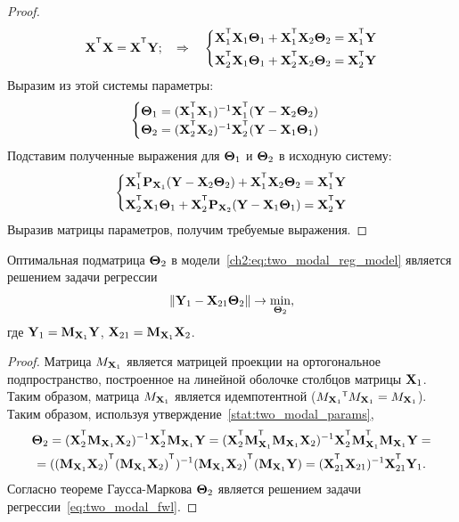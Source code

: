 \begin{proof}
	\[
		\bX^{\T} \bX = \bX^{\T} \bY; \quad \Rightarrow \quad
		\begin{cases*}
			\bX_1^{\T} \bX_1 \bTheta_1 + \bX_1^{\T} \bX_2 \bTheta_2 = \bX_1^{\T} \bY \\
			\bX_2^{\T} \bX_1 \bTheta_1 + \bX_2^{\T} \bX_2 \bTheta_2 = \bX_2^{\T} \bY 
		\end{cases*}
	\]
	Выразим из этой системы параметры:
	\[
		\begin{cases}
			\bTheta_1 = (\bX_1^{\T} \bX_1)^{-1} \bX_1^{\T} (\bY - \bX_2 \bTheta_2) \\
			\bTheta_2 = (\bX_2^{\T} \bX_2 )^{-1}  \bX_2^{\T} (\bY - \bX_1 \bTheta_1)
		\end{cases}
	\]
	Подставим полученные выражения для $\boldsymbol{\Theta}_1$ и $\boldsymbol{\Theta}_2$ в исходную систему:
	\[
				\begin{cases*}
					\bX_1^{\T} \bP_{\bX_1} (\bY - \bX_2 \bTheta_2) + \bX_1^{\T} \bX_2 \bTheta_2 = \bX_1^{\T} \bY \\
					\bX_2^{\T} \bX_1 \bTheta_1 + \bX_2^{\T}\bP_{\bX_2} (\bY - \bX_1 \bTheta_1) = \bX_2^{\T} \bY 
				\end{cases*}
	\]
	Выразив матрицы параметров, получим требуемые выражения.
\end{proof}

\begin{statement}
	\label{stat:two_modal_theta2}
	Оптимальная подматрица $\boldsymbol{\Theta}_2$ в модели~\eqref{ch2:eq:two_modal_reg_model} является решением задачи регрессии
	\begin{equation}
		\| \mathbf{Y}_1 -  \mathbf{X}_{21} \boldsymbol{\Theta}_2 \| \rightarrow \min_{\boldsymbol{\Theta}_2},
		\label{eq:two_modal_fwl}
	\end{equation}
	где $\mathbf{Y}_1 = \mathbf{M}_{\mathbf{X}_1} \mathbf{Y}$, $\mathbf{X}_{21} = \mathbf{M}_{\mathbf{X}_1} \mathbf{X}_2$.
\end{statement}

\begin{proof}
	Матрица $M_{\mathbf{X}_1}$ является матрицей проекции на ортогональное подпространство, построенное на линейной оболочке столбцов матрицы $\mathbf{X}_1$. Таким образом, матрица $M_{\mathbf{X}_1}$ является идемпотентной ($M_{\bX_1}{\T} M_{\bX_1} = M_{\bX_1}$). 
	Таким образом, используя утверждение~\autoref{stat:two_modal_params},
	\begin{multline*}
		\bTheta_2 = (\bX_2^{\T} \bM_{\bX_1} \bX_2)^{-1} \bX_2^{\T} \bM_{\bX_1} \bY = (\bX_2^{\T} \bM_{\bX_1}^{\T} \bM_{\bX_1} \bX_2)^{-1} \bX_2^{\T} \bM_{\bX_1}^{\T} \bM_{\bX_1} \bY = \\
		= ((\bM_{\bX_1} \bX_2)^{\T} (\bM_{\bX_1} \bX_2)^{\T})^{-1} (\bM_{\bX_1} \bX_2)^{\T} (\bM_{\bX_1} \bY) = (\bX_{21}^{\T} \bX_{21})^{-1} \bX_{21}^{\T} \bY_1.
	\end{multline*}
	Согласно теореме Гаусса-Маркова $\boldsymbol{\Theta}_2$ является решением задачи регрессии~\eqref{eq:two_modal_fwl}.
\end{proof}

